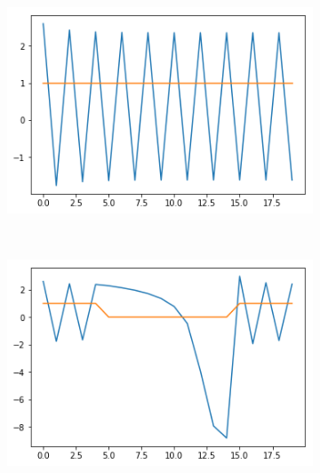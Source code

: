 \documentclass[12pt, letterpaper]{article}
\begin{document}
\begin{figure}[h]
    \centering
    \begin{subfigure}[b]{0.3\textwidth}
        \includegraphics[width=\textwidth]{basic1}
        \label{fig:gull}
    \end{subfigure}
    ~ %
    \begin{subfigure}[b]{0.3\textwidth}
        \includegraphics[width=\textwidth]{basic2}
        \label{fig:tiger}
    \end{subfigure}
    ~ %
    \begin{subfigure}[b]{0.3\textwidth}

\end{subfigure}
\end{figure}
\end{document}
